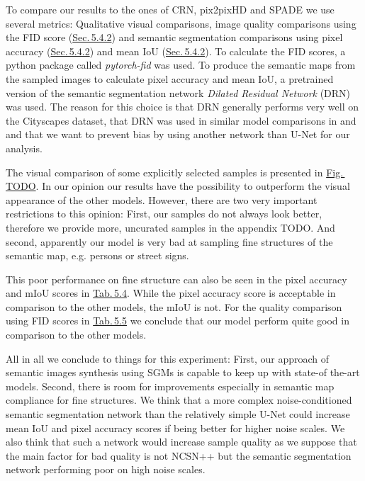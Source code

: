 To compare our results to the ones of CRN, pix2pixHD and SPADE we use several metrics: Qualitative visual comparisons, image quality comparisons using the FID score (\hyperref[sec:fid]{Sec.\,5.4.2}) and semantic segmentation comparisons using pixel accuracy (\hyperref[sec:acc]{Sec.\,5.4.2}) and mean IoU (\hyperref[sec:fid]{Sec.\,5.4.2}). To calculate the FID scores, a python package called \textit{pytorch-fid} \cite{fid_pytorch} was used. To produce the semantic maps from the sampled images to calculate pixel accuracy and mean IoU, a pretrained version of the semantic segmentation network \textit{Dilated Residual Network} (DRN) \cite{drn} was used. The reason for this choice is that DRN generally performs very well on the Cityscapes dataset, that DRN was used in similar model comparisons in \cite{pix2pix} and \cite{spade} and that we want to prevent bias by using another network than U-Net for our analysis.
 
The visual comparison of some explicitly selected samples is presented in \hyperref[fig:]{Fig.\,TODO}. In our opinion our results have the possibility to outperform the visual appearance of the other models. However, there are two very important restrictions to this opinion: First, our samples do not always look better, therefore we provide more, uncurated samples in the appendix TODO. And second, apparently our model is very bad at sampling fine structures of the semantic map, e.g. persons or street signs. 

This poor performance on fine structure can also be seen in the pixel accuracy and mIoU scores in \hyperref[tab:5.4]{Tab.\,5.4}. While the pixel accuracy score is acceptable in comparison to the other models, the mIoU is not. For the quality comparison using FID scores in \hyperref[tab:5.5]{Tab.\,5.5} we conclude that our model perform quite good in comparison to the other models.

All in all we conclude to things for this experiment: First, our approach of semantic images synthesis using SGMs is capable to keep up with state-of the-art models. Second, there is room for improvements especially in semantic map compliance for fine structures. We think that a more complex noise-conditioned semantic segmentation network than the relatively simple U-Net could increase mean IoU and pixel accuracy scores if being better for higher noise scales. We also think that such a network would increase sample quality as we suppose that the main factor for bad quality is not NCSN++ but the semantic segmentation network performing poor on high noise scales.

